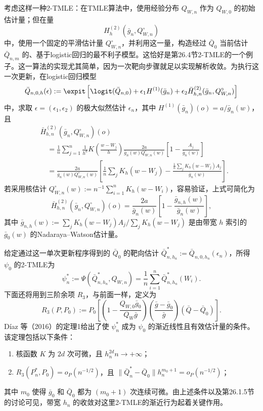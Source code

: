 考虑这样一种2-TMLE：在TMLE算法中，使用经验分布 $Q_{W,n}$ 作为 $Q_{W,0}$ 的初始估计量；但在量
\[
H_h^{(2)}(\bar g_n,Q_{W,n}^\circ)
\]
中，使用一个固定的平滑估计量 $Q_{W,n}^\circ$，并利用这一量，构造经过 $\bar Q_0$ 当前估计 $\bar Q_{n,m}$ 的、基于logistic回归的最不利子模型。这恰好是第26.4节2-TMLE的一个例子。这一算法的实现尤其简单，因为一次靶向步骤就足以实现解析收敛。为执行这一次更新，在logistic回归模型
\[
\bar Q_{n,0,h}(\epsilon):=\expit\left[\logit(\bar Q_{n,0})
+\epsilon_1H^{(1)}(\bar g_n)+\epsilon_2\bar H_{h,n}^{(2)}(\bar g_n,Q_{W,n}^\circ)\right]
\]
中，求取 $\epsilon=(\epsilon_1,\epsilon_2)$ 的极大似然估计 $\epsilon_n$，其中 $H^{(1)}(\bar g_n)(o)=a/\bar g_n(w)$，且
\[
\begin{aligned}
&\bar H_{h,n}^{(2)}(\bar g_n,Q_{W,n}^\circ)(o)\\
&\quad=\frac1n\sum_{j=1}^n\frac1{h^d}K\left(\frac{w-W_j}{h}\right)
\frac{2a}{\bar g_n(w)Q_{W,n}^\circ(w)}\left[1-\frac{A_j}{\bar g_n(w)}\right]\\
&\quad=\frac{2a}{\bar g_n(w)Q_{W,n}^\circ(w)}
\left[\frac1n\sum_jK_h(w-W_j)
-\frac{\frac1n\sum_jK_h(w-W_j)A_j}{\bar g_n(w)}\right].
\end{aligned}
\]
若采用核估计 $Q_{W,n}^\circ(w):=n^{-1}\sum_{i=1}^nK_h(w-W_i)$，容易验证，上式可简化为
\[
\bar H_{h,n}^{(2)}(\bar g_n,Q_{W,n}^\circ)(o)=\frac{2a}{\bar g_n(w)}
\left[1-\frac{\bar g_{n,h}(w)}{\bar g_n(w)}\right],
\]
其中 $\bar g_{n,h}(w):=\sum_jK_h(w-W_j)A_j/\sum_jK_h(w-W_j)$ 是由带宽 $h$ 索引的 $\bar g_0(w)$ 的Nadaraya--Watson估计量。

给定通过这一单次更新程序得到的 $\bar Q_0$ 的靶向估计 $\bar Q_{n,h_n}^*:=\bar Q_{n,0,h_n}(\epsilon_n)$，所得 $\psi_0$ 的2-TMLE为
\[
\psi_n^*:=\Psi(\bar Q_{n,h_n}^*,Q_{W,n})=\frac1n\sum_{i=1}^n\bar Q_{n,h_n}^*(W_i).
\]
下面还将用到三阶余项 $R_3$，与前面一样，定义为
\[
R_3(P,P_0):=P_0\left[\left(1-\frac{Q_{W,0}\bar g_0}{Q_W\bar g}\right)
\left(\frac{\bar g-\bar g_0}{\bar g}\right)(\bar Q-\bar Q_0)\right].
\]
Díaz 等（2016）的定理1给出了使 $\psi_n^*$ 成为 $\psi_0$ 的渐近线性且有效估计量的条件。该定理包括以下条件：
\begin{enumerate}
\item 核函数 $K$ 为 $2d$ 次可微，且 $h_n^{2d}n\to+\infty$；
\item $R_3(P_n^*,P_0)=o_P(n^{-1/2})$，且 $\|\bar Q_n^*-\bar Q_0\|h_n^{m_0+1}=o_P(n^{-1/2})$；
\end{enumerate}
其中 $m_0$ 使得 $\bar g_0$ 和 $\bar Q_0$ 都为 $(m_0+1)$ 次连续可微。由上述条件以及第26.1.5节的讨论可见，带宽 $h_n$ 的收敛对这里2-TMLE的渐近行为起着关键作用。

